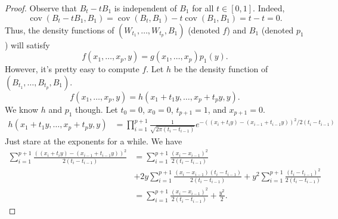 \documentclass{scrartcl}
\DeclareMathOperator{\cov}{cov}
\begin{document}
\begin{proof}
    Observe that $B_t - t B_1$ is independent of $B_1$ for all $t\in [0,1]$. Indeed,
    \[
        \cov(B_t - tB_1, B_1) = \cov(B_t, B_1) - t\cov(B_1, B_1) = t - t = 0.
    \]
    Thus, the density functions of $(W_{t_1},\dots, W_{t_p}, B_1)$ (denoted $f$) and $B_1$ (denoted $p_1$) will satisfy
    \[
        f(x_1,\dots, x_p, y) = g(x_1,\dots, x_p)p_1(y).
    \]
    However, it's pretty easy to compute $f$. Let $h$ be the density function of $(B_{t_1},\dots, B_{t_p}, B_1)$.
    \[
        f(x_1,\dots, x_p, y) = h(x_1 + t_1 y, \dots, x_p + t_p y, y).
    \]
    We know $h$ and $p_1$ though. Let $t_0 = 0$, $x_0 = 0$, $t_{p+1} = 1$, and $x_{p+1} = 0$.
    \begin{align*}
        h(x_1 + t_1 y,\dots, x_p + t_p y, y) &= \prod_{i=1}^{p+1} \frac{1}{\sqrt{2\pi (t_i - t_{i-1})}}e^{-((x_i + t_i y) - (x_{i-1} + t_{i-1}y))^2/2(t_i - t_{i-1})}
    \end{align*}
    Just stare at the exponents for a while. We have
    \begin{align*}
        \sum_{i=1}^{p+1} \frac{((x_i + t_i y) - (x_{i-1} + t_{i-1}y))^2}{2(t_i - t_{i-1})} &= \sum_{i=1}^{p+1} \frac{(x_i - x_{i-1})^2}{2(t_i - t_{i-1})}\\
        &+ 2y \sum_{i=1}^{p+1} \frac{(x_i - x_{i-1})(t_i - t_{i-1})}{2(t_i - t_{i-1})} + y^2\sum_{i=1}^{p+1} \frac{(t_i - t_{i-1})^2}{2(t_i - t_{i-1})} \\
        &= \sum_{i=1}^{p+1} \frac{(x_i - x_{i-1})^2}{2(t_i - t_{i-1})} + \frac{y^2}{2}.
    \end{align*}

\end{proof}
\end{document}
